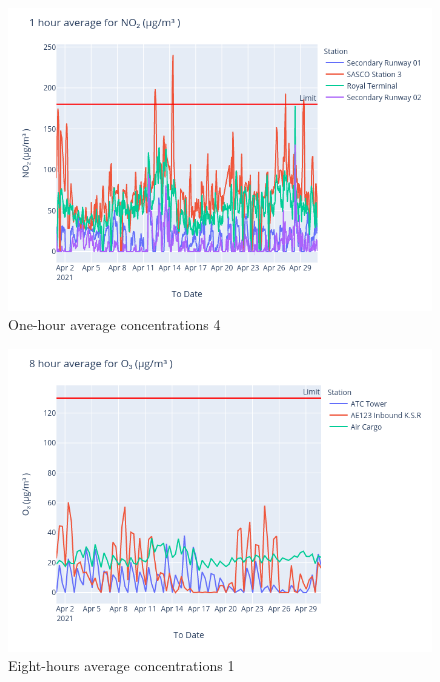 \documentclass[12pt, oneside]{book}
\begin{document}
{
{\begin{figure}[H]
\centering
\includegraphics[width=\textwidth]{image219}
\caption{One-hour average  concentrations 4}\label{image219}
\end{figure}}{}


{\begin{figure}[H]
\centering
\includegraphics[width=\textwidth]{image184}
\caption{Eight-hours average  concentrations 1}\label{image184}
\end{figure}}{}


}
\end{document}
